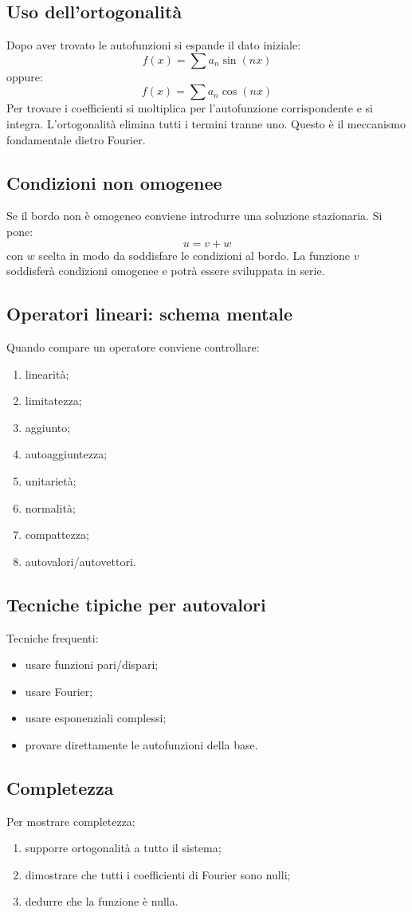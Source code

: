 \documentclass[a4paper,10pt]{article}
\begin{document}
\subsection{Uso dell'ortogonalità}
Dopo aver trovato le autofunzioni si espande il dato iniziale:
\[f(x)=\sum a_n\sin(nx)\]
oppure:
\[f(x)=\sum a_n\cos(nx)\]
Per trovare i coefficienti si moltiplica per l'autofunzione corrispondente e si integra.
L'ortogonalità elimina tutti i termini tranne uno.
Questo è il meccanismo fondamentale dietro Fourier.
\subsection{Condizioni non omogenee}
Se il bordo non è omogeneo conviene introdurre una soluzione stazionaria.
Si pone:
\[u=v+w\]
con $w$ scelta in modo da soddisfare le condizioni al bordo.
La funzione $v$ soddisferà condizioni omogenee e potrà essere sviluppata in serie.
\subsection{Operatori lineari: schema mentale}
Quando compare un operatore conviene controllare:
\begin{enumerate}
\item linearità;
\item limitatezza;
\item aggiunto;
\item autoaggiuntezza;
\item unitarietà;
\item normalità;
\item compattezza;
\item autovalori/autovettori.
\end{enumerate}
\subsection{Tecniche tipiche per autovalori}
Tecniche frequenti:
\begin{itemize}
\item usare funzioni pari/dispari;
\item usare Fourier;
\item usare esponenziali complessi;
\item provare direttamente le autofunzioni della base.
\end{itemize}
\subsection{Completezza}
Per mostrare completezza:
\begin{enumerate}
\item supporre ortogonalità a tutto il sistema;
\item dimostrare che tutti i coefficienti di Fourier sono nulli;
\item dedurre che la funzione è nulla.
\end{enumerate}
\end{document}
